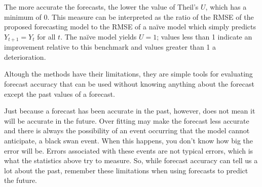 The more accurate the forecasts, the lower the value of Theil's $U$,   which has a minimum of 0. This measure can be interpreted as the ratio of the RMSE of the proposed forecasting model to the RMSE of  a na\"ive model which simply predicts $Y_{t+1} = Y_t$ for all $t$. The na\"ive model yields $U = 1$; values less than 1 indicate an  improvement relative to this benchmark and values greater than 1 a deterioration.

Altough the methods have their limitations, they are simple tools for evaluating forecast accuracy that can be used without knowing anything about the forecast except the past values of a forecast.

Just because a forecast has been accurate in the past, however, does not mean it will be accurate in the future. Over fitting may make the forecast less accurate and there is always the possibility of an event occurring that the model cannot anticipate, a black swan event. When this happens, you don’t know how big the error will be. Errors associated with these events are not typical errors, which is what the statistics above try to measure. So, while forecast accuracy can tell us a lot about the past, remember these limitations when using forecasts to predict the future.

\fi
